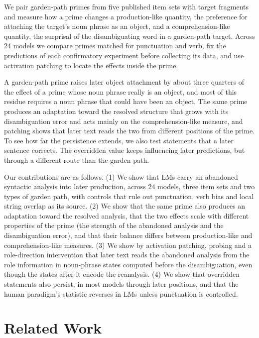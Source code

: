 \documentclass[11pt]{article}
\begin{document}
We pair garden-path primes from five published item sets with target fragments and measure how a prime changes a production-like quantity, the preference for attaching the target's noun phrase as an object, and a comprehension-like quantity, the surprisal of the disambiguating word in a garden-path target.
Across 24 models we compare primes matched for punctuation and verb, fix the predictions of each confirmatory experiment before collecting its data, and use activation patching to locate the effects inside the prime.

A garden-path prime raises later object attachment by about three quarters of the effect of a prime whose noun phrase really is an object, and most of this residue requires a noun phrase that could have been an object.
The same prime produces an adaptation toward the resolved structure that grows with its disambiguation error and acts mainly on the comprehension-like measure, and patching shows that later text reads the two from different positions of the prime.
To see how far the persistence extends, we also test statements that a later sentence corrects.
The overridden value keeps influencing later predictions, but through a different route than the garden path.

Our contributions are as follows.
(1) We show that LMs carry an abandoned syntactic analysis into later production, across 24 models, three item sets and two types of garden path, with controls that rule out punctuation, verb bias and local string overlap as its source.
(2) We show that the same prime also produces an adaptation toward the resolved analysis, that the two effects scale with different properties of the prime (the strength of the abandoned analysis and the disambiguation error), and that their balance differs between production-like and comprehension-like measures.
(3) We show by activation patching, probing and a role-direction intervention that later text reads the abandoned analysis from the role information in noun-phrase states computed before the disambiguation, even though the states after it encode the reanalysis.
(4) We show that overridden statements also persist, in most models through later positions, and that the human paradigm's statistic reverses in LMs unless punctuation is controlled.

\section{Related Work}
\end{document}
